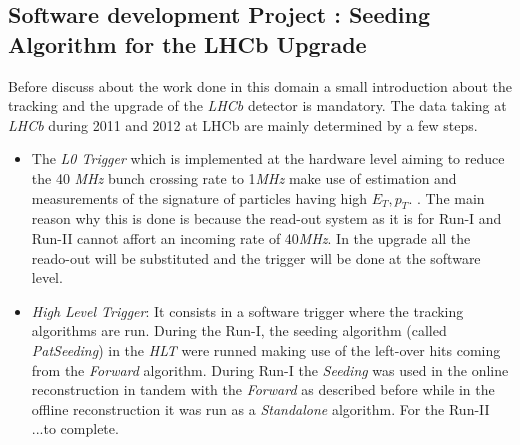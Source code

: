 \documentclass[paper=a4, fontsize=10pt]{scrartcl}
\numberwithin{equation}{section}		%
\numberwithin{figure}{section}			%
\numberwithin{table}{section}				%
\begin{document}
\subsection{Software development Project : Seeding Algorithm for the LHCb Upgrade}
Before discuss about the work done in this domain a small introduction about the tracking and the upgrade of the \textit{LHCb} detector is mandatory.
The data taking at \textit{LHCb} during 2011 and 2012 at LHCb are mainly determined by a few steps.
\begin{itemize}
\item{The \textit{L0 Trigger} which is implemented at the hardware level aiming to reduce the 40 \textit{MHz} bunch crossing rate to 1\textit{MHz} make use of estimation and measurements of the signature of particles having high $E_{T},p_{T}$. }. The main reason why this is done is because the read-out system as it is for Run-I and Run-II cannot affort an incoming rate of 40\textit{MHz}. In the upgrade all the reado-out will be substituted and the trigger will be done at the software level.
\item{\textit{High Level Trigger}: It consists in a software trigger where the tracking algorithms are run. During the Run-I, the seeding algorithm (called \textit{PatSeeding}) in the \textit{HLT} were runned making use of the left-over hits coming from the \textit{Forward} algorithm. During Run-I the \textit{Seeding} was used in the online reconstruction in tandem with the \textit{Forward} as described before while in the offline reconstruction it was run as a \textit{Standalone} algorithm. For the Run-II ...to complete.

}
\end{itemize}
\end{document}
